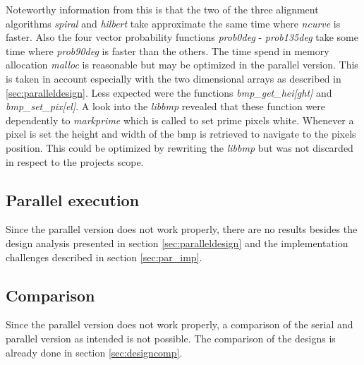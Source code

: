 Noteworthy information from this is that the two of the three alignment algorithms \emph{spiral} and \emph{hilbert} take approximate the same time where \emph{ncurve} is faster. Also the four vector probability functions \emph{prob0deg} - \emph{prob135deg} take some time where \emph{prob90deg} is faster than the others. The time spend in memory allocation \emph{malloc} is reasonable but may be optimized in the parallel version. This is taken in account especially with the two dimensional arrays as described in \ref{sec:paralleldesign}.
Less expected were the functions \emph{bmp\_get\_hei[ght]} and \emph{bmp\_set\_pix[el]}. A look into the \emph{libbmp} revealed that these function were dependently to \emph{markprime} which is called to set prime pixels white. Whenever a pixel is set the height and width of the bmp is retrieved to navigate to the pixels position. This could be optimized by rewriting the \emph{libbmp} but was not discarded in respect to the projects scope.

\subsection{Parallel execution}
\label{sec:par_ex}
Since the parallel version does not work properly, there are no results besides the design analysis presented in section \ref{sec:paralleldesign} and the implementation challenges described in section \ref{sec:par_imp}.

\subsection{Comparison}
Since the parallel version does not work properly, a comparison of the serial and parallel version as intended is not possible. The comparison of the designs is already done in section \ref{sec:designcomp}.





